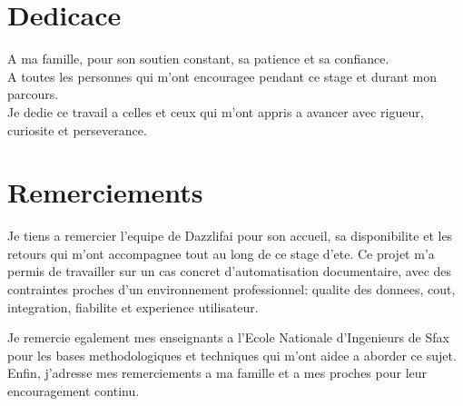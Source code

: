 \chapter*{Dedicace}
\thispagestyle{empty}

\begin{center}
  A ma famille, pour son soutien constant, sa patience et sa confiance. ~\\
  A toutes les personnes qui m'ont encouragee pendant ce stage et durant mon parcours. ~\\
  Je dedie ce travail a celles et ceux qui m'ont appris a avancer avec rigueur, curiosite et perseverance. ~\\
\end{center}


\cleardoublepage%
\chapter*{Remerciements}
\thispagestyle{empty}

Je tiens a remercier l'equipe de Dazzlifai pour son accueil, sa disponibilite et les retours qui m'ont accompagnee tout au long de ce stage d'ete. Ce projet m'a permis de travailler sur un cas concret d'automatisation documentaire, avec des contraintes proches d'un environnement professionnel: qualite des donnees, cout, integration, fiabilite et experience utilisateur.

Je remercie egalement mes enseignants a l'Ecole Nationale d'Ingenieurs de Sfax pour les bases methodologiques et techniques qui m'ont aidee a aborder ce sujet. Enfin, j'adresse mes remerciements a ma famille et a mes proches pour leur encouragement continu.
